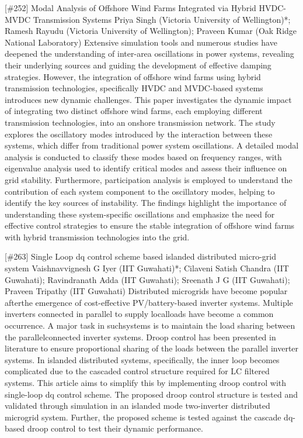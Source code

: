 {} \begin{abstract_online} {[\#252] Modal Analysis of Offshore Wind Farms Integrated via Hybrid HVDC- MVDC Transmission Systems} {} {Priya Singh (Victoria University of Wellington)*; Ramesh Rayudu (Victoria University of Wellington); Praveen Kumar (Oak Ridge National Laboratory)} {} Extensive simulation tools and numerous studies have deepened the understanding of inter-area oscillations in power systems, revealing their underlying sources and guiding the development of effective damping strategies. However, the integration of offshore wind farms using hybrid transmission technologies, specifically HVDC and MVDC-based systems introduces new dynamic challenges. This paper investigates the dynamic impact of integrating two distinct offshore wind farms, each employing different transmission technologies, into an onshore transmission network. The study explores the oscillatory modes introduced by the interaction between these systems, which differ from traditional power system oscillations. A detailed modal analysis is conducted to classify these modes based on frequency ranges, with eigenvalue analysis used to identify critical modes and assess their influence on grid stability. Furthermore, participation analysis is employed to understand the contribution of each system component to the oscillatory modes, helping to identify the key sources of instability. The findings highlight the importance of understanding these system-specific oscillations and emphasize the need for effective control strategies to ensure the stable integration of offshore wind farms with hybrid transmission technologies into the grid. \end{abstract_online} 
{} \begin{abstract_online} {[\#263] Single Loop dq control scheme based islanded distributed micro-grid system} {} {Vaishnavvignesh G Iyer (IIT Guwahati)*; Cilaveni Satish Chandra (IIT Guwahati); Ravindranath  Adda (IIT Guwahati); Sreenath J G (IIT Guwahati); Praveen  Tripathy (IIT Guwahati)} {} Distributed microgrids have become popular afterthe emergence of cost-effective PV/battery-based inverter systems. Multiple inverters connected in parallel to supply localloads have become a common occurrence. A major task in suchsystems is to maintain the load sharing between the parallelconnected inverter systems. Droop control has been presented in literature to ensure proportional sharing of the loads between the parallel inverter systems. In islanded distributed systems, specifically, the inner loop becomes complicated due to the cascaded control structure required for LC filtered systems. This article aims to simplify this by implementing droop control with single-loop dq control scheme. The proposed droop control structure is tested and validated through simulation in an islanded mode two-inverter distributed microgrid system. Further, the proposed scheme is tested against the cascade dq-based droop control to test their dynamic performance. \end{abstract_online} 
